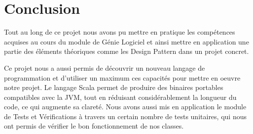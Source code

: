 \documentclass[french]{article}
\begin{document}
\section{Conclusion}
Tout au long de ce projet nous avons pu mettre en pratique les compétences acquises au cours du module de Génie Logiciel et ainsi mettre en application une partie des éléments théoriques comme les Design Pattern dans un projet concret. 

Ce projet nous a aussi permis de découvrir un nouveau langage de programmation et d'utiliser un maximum ces capacités pour mettre en oeuvre notre projet. Le langage Scala permet de produire des binaires portables compatibles avec la JVM, tout en réduisant considérablement la longueur du code, ce qui augmente sa clareté. Nous avons aussi mis en application le module de Tests et Vérifications à travers un certain nombre de tests unitaires, qui nous ont permis de vérifier le bon fonctionnement de nos classes.


\end{document}
